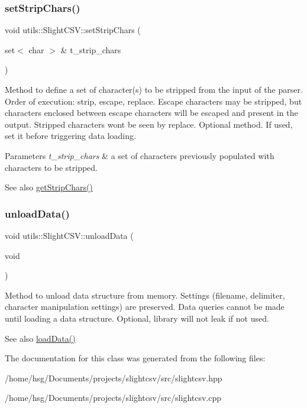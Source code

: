 \subsubsection{\texorpdfstring{set\+Strip\+Chars()}{setStripChars()}}
{\footnotesize\ttfamily void utils\+::\+Slight\+C\+S\+V\+::set\+Strip\+Chars (\begin{DoxyParamCaption}\item[{set$<$ char $>$ \&}]{t\+\_\+strip\+\_\+chars }\end{DoxyParamCaption})}

Method to define a set of character(s) to be stripped from the input of the parser. Order of execution\+: strip, escape, replace. Escape characters may be stripped, but characters enclosed between escape characters will be escaped and present in the output. Stripped characters won\textquotesingle{}t be seen by replace. Optional method. If used, set it before triggering data loading. 
\begin{DoxyParams}{Parameters}
{\em t\+\_\+strip\+\_\+chars} & a set of characters previously populated with characters to be stripped. \\
\hline
\end{DoxyParams}
\begin{DoxySeeAlso}{See also}
\hyperlink{classutils_1_1SlightCSV_a13d435b5e07c827f6688efa9bf4673d4}{get\+Strip\+Chars()} 
\end{DoxySeeAlso}
\mbox{\label{classutils_1_1SlightCSV_aaa9c8042d6231660cb08ada7c1a8dccb}} 
\subsubsection{\texorpdfstring{unload\+Data()}{unloadData()}}
{\footnotesize\ttfamily void utils\+::\+Slight\+C\+S\+V\+::unload\+Data (\begin{DoxyParamCaption}\item[{void}]{ }\end{DoxyParamCaption})}

Method to unload data structure from memory. Settings (filename, delimiter, character manipulation settings) are preserved. Data queries cannot be made until loading a data structure. Optional, library will not leak if not used. \begin{DoxySeeAlso}{See also}
\hyperlink{classutils_1_1SlightCSV_adea079ec76c9ee67d096f8fd39946380}{load\+Data()} 
\end{DoxySeeAlso}


The documentation for this class was generated from the following files\+:\begin{DoxyCompactItemize}
\item 
/home/hsg/\+Documents/projects/slightcsv/src/slightcsv.\+hpp\item 
/home/hsg/\+Documents/projects/slightcsv/src/slightcsv.\+cpp\end{DoxyCompactItemize}
